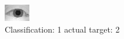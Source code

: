 \begin{figure}[h!]
\begin{center}
\includegraphics[width=0.60\columnwidth]{figures/ID1002_class_1_target_2.png}
\end{center}
\caption{ Classification: 1 actual target: 2}
\label{fig:ID1002_class_1_target_2}
\end{figure}
